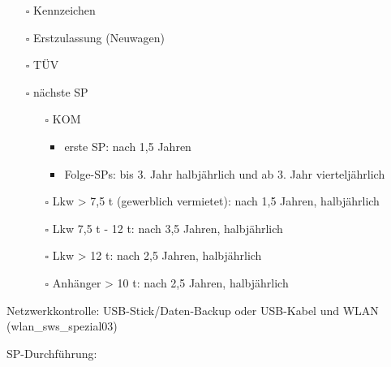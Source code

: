 \documentclass{vorlage-design-main}
\begin{document}
\begin{itemize}
\begin{itemize}
  \item[$\square$]
    Kennzeichen
  \item[$\square$]
    Erstzulassung (Neuwagen)
  \item[$\square$]
    TÜV
  \item[$\square$]
    nächste SP

    \begin{itemize}

    \item[$\square$]
      KOM

      \begin{itemize}

      \item
        erste SP: nach 1,5 Jahren
      \item
        Folge-SPs: bis 3. Jahr halbjährlich und ab 3. Jahr
        vierteljährlich
      \end{itemize}
    \item[$\square$]
      Lkw \textgreater{} 7,5 t (gewerblich vermietet): nach 1,5 Jahren,
      halbjährlich
    \item[$\square$]
      Lkw 7,5 t - 12 t: nach 3,5 Jahren, halbjährlich
    \item[$\square$]
      Lkw \textgreater{} 12 t: nach 2,5 Jahren, halbjährlich
    \item[$\square$]
      Anhänger \textgreater{} 10 t: nach 2,5 Jahren, halbjährlich
    \end{itemize}
  \end{itemize}
\end{itemize}

Netzwerkkontrolle: USB-Stick/Daten-Backup oder USB-Kabel und WLAN
(wlan\_sws\_spezial03)

\newpage

SP-Durchführung:
\end{document}
